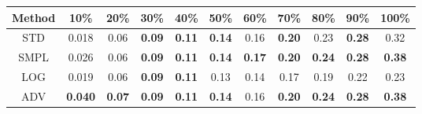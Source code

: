 \documentclass{standalone}
\begin{document}
\begin{tabular}{c|cccccccccc}
      \toprule
      Method & 10\% & 20\% & 30\% & 40\% & 50\% & 60\% & 70\% & 80\% & 90\% & 100\% \\
      \midrule
STD & 0.018 & 0.06 & \textbf{0.09} & \textbf{0.11} & \textbf{0.14} & 0.16 & \textbf{0.20} & 0.23 & \textbf{0.28} & 0.32\\
SMPL & 0.026 & 0.06 & \textbf{0.09} & \textbf{0.11} & \textbf{0.14} & \textbf{0.17} & \textbf{0.20} & \textbf{0.24} & \textbf{0.28} & \textbf{0.38}\\
LOG & 0.019 & 0.06 & \textbf{0.09} & \textbf{0.11} & 0.13 & 0.14 & 0.17 & 0.19 & 0.22 & 0.23\\
ADV & \textbf{0.040} & \textbf{0.07} & \textbf{0.09} & \textbf{0.11} & \textbf{0.14} & 0.16 & \textbf{0.20} & \textbf{0.24} & \textbf{0.28} & \textbf{0.38}\\
  \bottomrule
\end{tabular}
\end{document}
